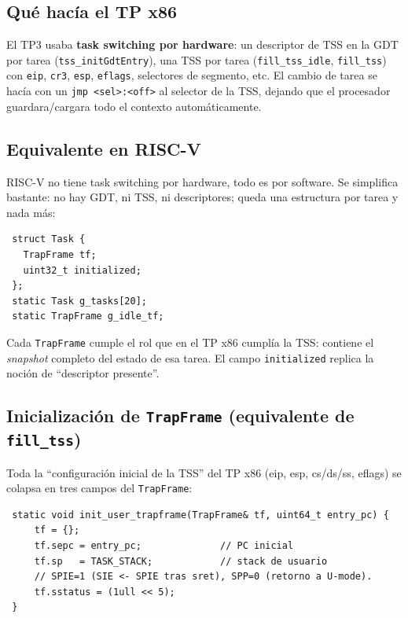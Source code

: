 \subsection{Qué hacía el TP x86}

El TP3 usaba \textbf{task switching por hardware}: un descriptor de TSS en la GDT por tarea
(\texttt{tss\_initGdtEntry}), una TSS por tarea (\texttt{fill\_tss\_idle}, \texttt{fill\_tss}) con \texttt{eip},
\texttt{cr3}, \texttt{esp}, \texttt{eflags}, selectores de segmento, etc. El cambio de tarea se hacía con un \texttt{jmp
<sel>:<off>} al selector de la TSS, dejando que el procesador guardara/cargara todo el contexto automáticamente.

\subsection{Equivalente en RISC-V}

RISC-V no tiene task switching por hardware, todo es por software. Se simplifica bastante: no hay GDT, ni TSS, ni
descriptores; queda una estructura por tarea y nada más:

\begin{codesnippet}
\begin{verbatim}
 struct Task {
   TrapFrame tf;
   uint32_t initialized;
 };
 static Task g_tasks[20];
 static TrapFrame g_idle_tf;
\end{verbatim}
\end{codesnippet}

Cada \texttt{TrapFrame} cumple el rol que en el TP x86 cumplía la TSS: contiene el \emph{snapshot} completo del estado
de esa tarea. El campo \texttt{initialized} replica la noción de ``descriptor presente''.

\subsection{Inicialización de \texttt{TrapFrame} (equivalente de \texttt{fill\_tss})}

Toda la ``configuración inicial de la TSS'' del TP x86 (eip, esp, cs/ds/ss, eflags) se colapsa en tres campos del
\texttt{TrapFrame}:

\begin{codesnippet}
\begin{verbatim}
 static void init_user_trapframe(TrapFrame& tf, uint64_t entry_pc) {
     tf = {};
     tf.sepc = entry_pc;              // PC inicial
     tf.sp   = TASK_STACK;            // stack de usuario
     // SPIE=1 (SIE <- SPIE tras sret), SPP=0 (retorno a U-mode).
     tf.sstatus = (1ull << 5);
 }
\end{verbatim}
\end{codesnippet}


